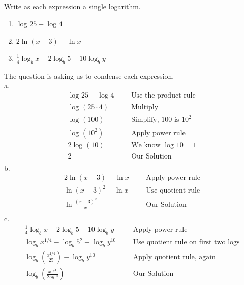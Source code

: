 \begin{exa}
	Write as each expression a single logarithm.
	\begin{enumerate}[\bfseries a.]
	    \item $\log_{}25+\log_{}4$
	    \item $2\ln{(x-3)}-\ln{x}$
	    \item $\frac{1}{4}\log_{b}x-2\log_{b}5-10\log_{b}y$
	\end{enumerate}
%
\end{exa}
The question is asking us to condense each expression.\\
 a.\begin{align*}
		\log_{}25+\log_{}4&	    &&\text{Use the product rule}\\
		\log_{}(25\cdot4)&		&&\text{Multiply}\\
		\log_{}(100)&			&&\text{Simplify, 100 is $10^2$}\\
		\log_{}(10^2)&			&&\text{Apply power rule}\\
		2\log_{}(10)&			&&\text{We know $\log_{}10=1$}
		\\
		2&						&&\text{Our Solution}\\
    \end{align*}
b.  \begin{align*}
		2\ln{(x-3)}-\ln{x}&		&&\text{Apply power rule}\\
		\ln{(x-3)^2}-\ln{x}&		&&\text{Use quotient rule}\\		
		\ln{\frac{(x-3)^2}{x}}&		&&\text{Our Solution}\\
    \end{align*}
c.  \begin{align*}
		\frac{1}{4}\log_{b}x-2\log_{b}5-10\log_{b}y&	&&\text{Apply power rule}\\
		\log_{b}x^{1/4}-\log_{b}5^2-\log_{b}y^{10}&	&&\text{Use quotient rule on first two logs}\\
		\log_{b}(\frac{x^{1/4}}{25})-\log_{b}y^{10}& &&\text{Apply quotient rule, again}\\
		\log_{b}(\frac{x^{1/4}}{25y^{10}})& &&\text{Our Solution}\\	 
	\end{align*}
